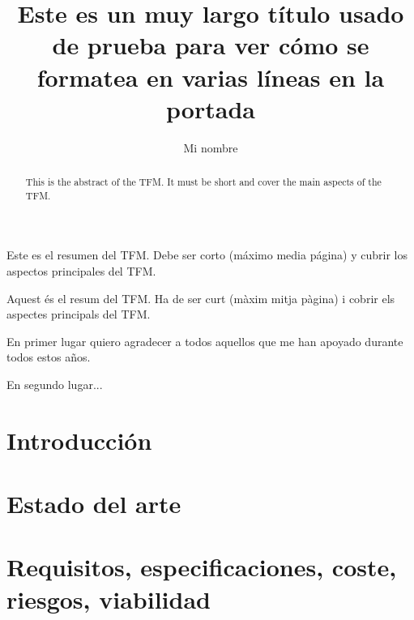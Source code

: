 \documentclass[twoside,spanish,a4paper,12pt]{tfg}
\title{Este es un muy largo título usado de prueba para ver cómo se formatea en varias líneas en la portada}
\author{Mi nombre}
\begin{document}
\portada
\cleardoublepage
\contraportada
\cleardoublepage
\declaracion
\cleardoublepage


\begin{resumen}
  Este es el resumen del TFM. Debe ser corto (máximo media página) y cubrir los aspectos principales del TFM.
\end{resumen}
\cleardoublepage

\begin{abstract}
  This is the abstract of the TFM. It must be short and cover the main aspects of the TFM.
\end{abstract}
\cleardoublepage

\begin{resum}
  Aquest és el resum del TFM. Ha de ser curt (màxim mitja pàgina) i cobrir els aspectes principals del TFM.
\end{resum}
\cleardoublepage


\begin{agradecimientos}
  En primer lugar quiero agradecer a todos aquellos que me han apoyado durante todos estos años.

  En segundo lugar...
\end{agradecimientos}
\cleardoublepage

\tableofcontents

\pagestyle{tfg}
\justify



\chapter{Introducción}


\chapter{Estado del arte}


\chapter{Requisitos, especificaciones, coste, riesgos, viabilidad}

\end{document}
